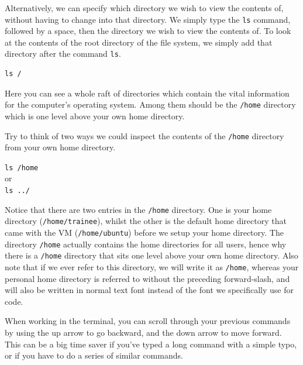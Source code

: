 \documentclass[a4paper,12pt,twoside]{memoir}
\begin{document}
\begin{steps}
Alternatively, we can specify which directory we wish to view the contents of, without having to change into that directory.
We simply type the \texttt{ls} command, followed by a space, then the directory we wish to view the contents of.
To look at the contents of the root directory of the file system, we simply add that directory after the command \texttt{ls}. \\
\begin{lstlisting}
ls /
\end{lstlisting}
\end{steps}

Here you can see a whole raft of directories which contain the vital information for the computer's operating system.
Among them should be the \texttt{/home} directory which is one level above your own home directory. \\

\begin{questions}
 Try to think of two ways we could inspect the contents of the \texttt{/home} directory from your own home directory. \\
\begin{answer}
\texttt{ls /home} \\
or \\
\texttt{ls ../} \\
\end{answer}
\end{questions}

\begin{note}
Notice that there are two entries in the \texttt{/home} directory. 
One is your home directory (\texttt{/home/trainee}), whilst the other is the default home directory that came with the VM (\texttt{/home/ubuntu}) before we setup your home directory.
The directory \texttt{/home} actually contains the home directories for all users, hence why there is a \texttt{/home} directory that sits one level above your own home directory.
Also note that if we ever refer to this directory, we will write it as \texttt{/home}, whereas your personal home directory is referred to without the preceding forward-slash, and will also be written in normal text font instead of the font we specifically use for code. \\
\end{note}

\begin{information}
When working in the terminal, you can scroll through your previous commands by using the up arrow to go backward, and the down arrow to move forward.
This can be a big time saver if you've typed a long command with a simple typo, or if you have to do a series of similar commands.
\end{information}
\end{document}
